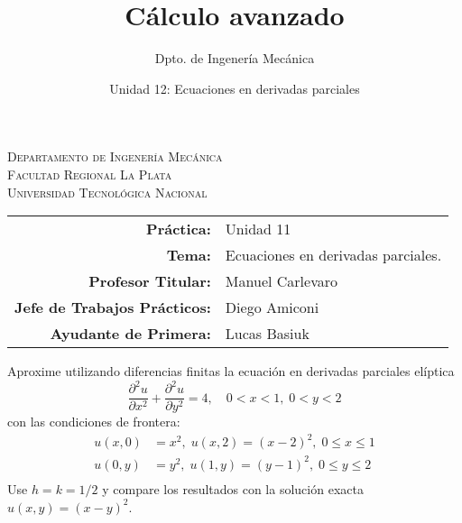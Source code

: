 \documentclass[11pt]{article}
\title{Cálculo avanzado}
\author{Dpto. de Ingenería Mecánica}
\date{Unidad 12: Ecuaciones en derivadas parciales}
\begin{document}

\begin{center}
\end{center} 

\begin{center}
\vspace{\baselineskip}
\Large{\textsc{Departamento de Ingenería Mecánica}} \\
\textsc{Facultad Regional La Plata} \\
\textsc{Universidad Tecnológica Nacional}
\end{center}


\begin{center}
\begin{tabular}{r l}
    \textbf{Práctica:} & Unidad 11 \\
 \textbf{Tema:} & Ecuaciones en derivadas parciales. \\
 \textbf{Profesor Titular:} & Manuel Carlevaro \\
 \textbf{Jefe de Trabajos Prácticos:} & Diego Amiconi \\
 \textbf{Ayudante de Primera:} & Lucas Basiuk 
\end{tabular}\end{center}

\vspace{1em}

\begin{question} %
Aproxime utilizando diferencias finitas la ecuación en derivadas parciales elíptica
\[ \frac{\partial^2 u}{\partial x^2} +  \frac{\partial^2 u}{\partial y^2} = 4, \quad 0 < x < 1, \; 0 < y < 2 \]
con las condiciones de frontera:
\begin{align*}
    u(x, 0) &= x^2,\; u(x, 2) = (x - 2)^2,\; 0 \leq x \leq 1 \\
    u(0, y) &= y^2,\; u(1, y) = (y - 1)^2,\; 0 \leq y \leq 2 \\
\end{align*}
Use $h = k = 1/2$ y compare los resultados con la solución exacta $u(x, y) = (x - y)^2$.
\end{question}
\end{document}
